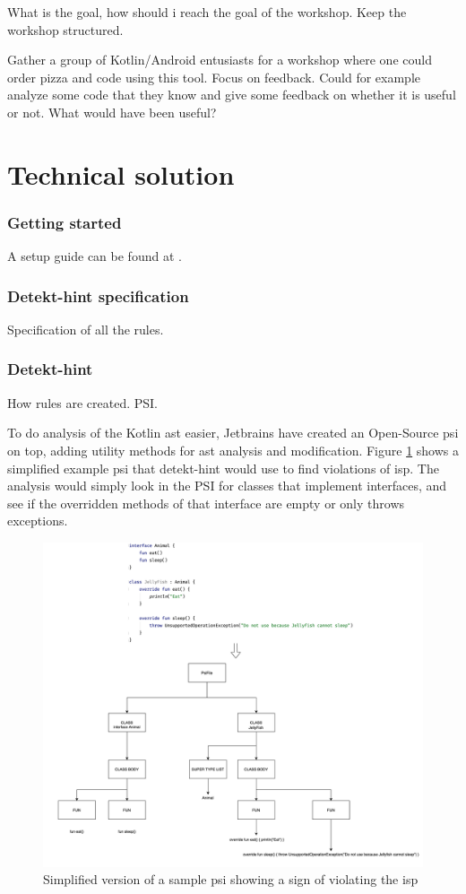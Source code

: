 \documentclass{report}
\begin{document}
What is the goal, how should i reach the goal of the workshop. Keep the workshop structured.


Gather a group of Kotlin/Android entusiasts for a workshop where one could order pizza and code using this tool. Focus on feedback. Could for example analyze some code that they know and give some feedback on whether it is useful or not. What would have been useful?


\section{Technical solution}
\label{technical-solution}
\subsubsection{Getting started}
A setup guide can be found at \cite{detekt-hint-repository}.

\subsubsection{Detekt-hint specification}
Specification of all the rules.

\subsubsection{Detekt-hint}
How rules are created. PSI.

To do analysis of the Kotlin \gls{ast} easier, Jetbrains\cite{jetbrains} have created an Open-Source \gls{psi} on top, adding utility methods for \gls{ast} analysis and modification. Figure \ref{fig:psi} shows a simplified example \gls{psi} that detekt-hint would use to find violations of \gls{isp}. The analysis would simply look in the PSI for classes that implement interfaces, and see if the overridden methods of that interface are empty or only throws exceptions. 

\begin{figure}[h!]
    \centering
    \includegraphics[width=\linewidth]{report/images/psi.png}
    \caption{Simplified version of a sample \gls{psi} showing a sign of violating the \gls{isp}}
    \label{fig:psi}
\end{figure}
\end{document}
